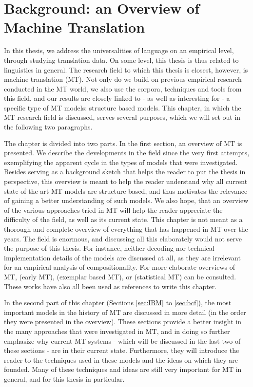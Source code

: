 \chapter{Background: an Overview of Machine Translation}

In this thesis, we address the universalities of language on an empirical level, through studying translation data. On some level, this thesis is thus related to linguistics in general. The research field to which this thesis is closest, however, is machine translation (MT). Not only do we build on previous empirical research conducted in the MT world, we also use the corpora, techniques and tools from this field, and our results are closely linked to - as well as interesting for - a specific type of MT models: structure based models. This chapter, in which the MT research field is discussed, serves several purposes, which we will set out in the following two paragraphs.

The chapter is divided into two parts. In the first section, an overview of MT is presented. We describe the developments in the field since the very first attempts, exemplifying the apparent cycle in the types of models that were investigated. Besides serving as a background sketch that helps the reader to put the thesis in perspective, this overview is meant to help the reader understand why all current state of the art MT models are structure based, and thus motivates the relevance of gaining a better understanding of such models. We also hope, that an overview of the various approaches tried in MT will help the reader appreciate the difficulty of the field, as well as its current state. This chapter is not meant as a thorough and complete overview of everything that has happened in MT over the years. The field is enormous, and discussing all this elaborately would not serve the purpose of this thesis. For instance, neither decoding nor technical implementation details of the models are discussed at all, as they are irrelevant for an empirical analysis of compositionality. For more elaborate overviews of MT, \cite{hutchins1992introduction} (early MT), \cite{somers1999review} (exemplar based MT), \cite{koehn2008statistical} or \cite{wu2005mt} (statistical MT) can be consulted. These works have also all been used as references to write this chapter.

In the second part of this chapter (Sections \ref{sec:IBM} to \ref{sec:bcf}), the most important models in the history of MT are discussed in more detail (in the order they were presented in the overview). These sections provide a better insight in the many approaches that were investigated in MT, and in doing so further emphasize why current MT systems - which will be discussed in the last two of these sections - are in their current state. Furthermore, they will introduce the reader to the techniques used in these models and the ideas on which they are founded. Many of these techniques and ideas are still very important for MT in general, and for this thesis in particular.

